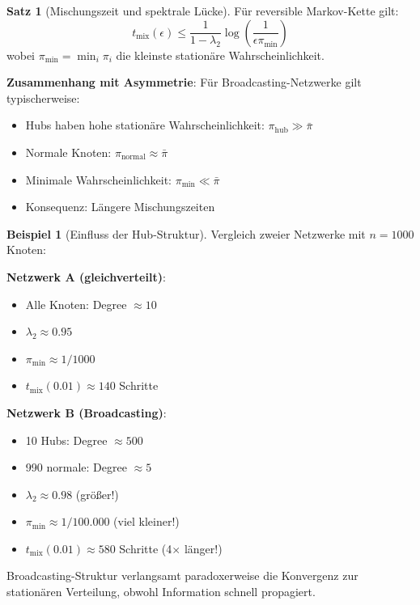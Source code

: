 \documentclass[a4paper,12pt]{report}
\theoremstyle{definition}
\newtheorem{beispiel}{Beispiel}
\newtheorem{satz}{Satz}
\begin{document}
	\begin{satz}[Mischungszeit und spektrale Lücke]
		Für reversible Markov-Kette gilt:
		\[
		t_{\text{mix}}(\epsilon) \leq \frac{1}{1-\lambda_2} \log\left(\frac{1}{\epsilon \pi_{\min}}\right)
		\]
		wobei $\pi_{\min} = \min_i \pi_i$ die kleinste stationäre Wahrscheinlichkeit.
		
		\textbf{Zusammenhang mit Asymmetrie}:
		Für Broadcasting-Netzwerke gilt typischerweise:
		\begin{itemize}
			\item Hubs haben hohe stationäre Wahrscheinlichkeit: $\pi_{\text{hub}} \gg \bar{\pi}$
			\item Normale Knoten: $\pi_{\text{normal}} \approx \bar{\pi}$
			\item Minimale Wahrscheinlichkeit: $\pi_{\min} \ll \bar{\pi}$
			\item Konsequenz: Längere Mischungszeiten
		\end{itemize}
	\end{satz}
	
	\begin{beispiel}[Einfluss der Hub-Struktur]
		Vergleich zweier Netzwerke mit $n = 1000$ Knoten:
		
		\textbf{Netzwerk A (gleichverteilt)}:
		\begin{itemize}
			\item Alle Knoten: Degree $\approx 10$
			\item $\lambda_2 \approx 0.95$
			\item $\pi_{\min} \approx 1/1000$
			\item $t_{\text{mix}}(0.01) \approx 140$ Schritte
		\end{itemize}
		
		\textbf{Netzwerk B (Broadcasting)}:
		\begin{itemize}
			\item 10 Hubs: Degree $\approx 500$
			\item 990 normale: Degree $\approx 5$
			\item $\lambda_2 \approx 0.98$ (größer!)
			\item $\pi_{\min} \approx 1/100.000$ (viel kleiner!)
			\item $t_{\text{mix}}(0.01) \approx 580$ Schritte (4$\times$ länger!)
		\end{itemize}
		
		Broadcasting-Struktur verlangsamt paradoxerweise die Konvergenz zur stationären Verteilung, obwohl Information schnell propagiert.
	\end{beispiel}
	
\end{document}
